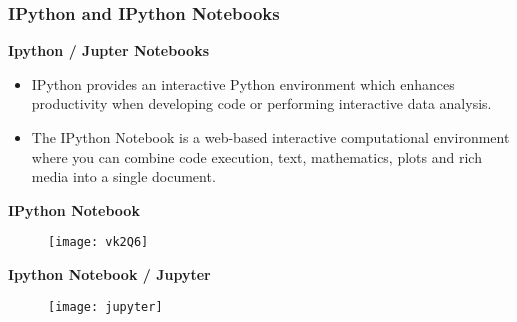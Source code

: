 \documentclass[MASTER.tex]{subfiles}
\begin{document}
	
%
%
%
%
\begin{frame}
\frametitle{IPython and IPython Notebooks}
\Large
\noindent \textbf{Ipython / Jupter Notebooks}\\
\begin{itemize}
\item IPython provides an interactive Python environment which enhances productivity when developing code
or performing interactive data analysis.\\ \bigskip

\item The IPython Notebook is a web-based interactive computational environment where you can combine code execution, text, mathematics, plots and rich media into a single document.
\end{itemize}

\end{frame}
\begin{frame}
\textbf{IPython Notebook}
	\begin{figure}
\centering
\texttt{[image: vk2Q6]}

\end{figure}

\end{frame}

\begin{frame}
	\textbf{Ipython Notebook / Jupyter}
	\vspace{-0.4cm}
	\begin{figure}
\centering
\texttt{[image: jupyter]}

\end{figure}

\end{frame}
	
\end{document}
